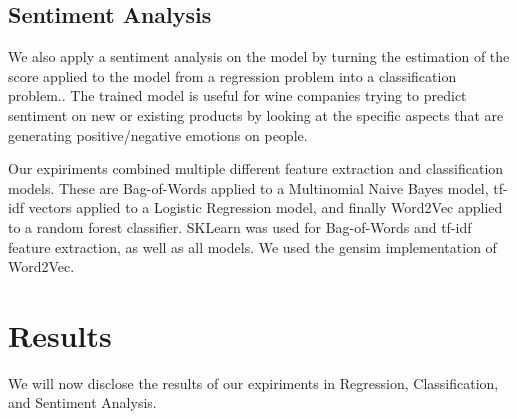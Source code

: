 \documentclass[12pt]{IEEEtran}
\begin{document}
\subsection{Sentiment Analysis}
    We also apply a sentiment analysis on the model by turning the estimation of the score applied to the model from a regression problem into a classification problem.. The trained model is useful for wine companies trying to predict sentiment on new or existing products by looking at the specific aspects that are generating positive/negative emotions on people. \par
    Our expiriments combined multiple different feature extraction and classification models. These are Bag-of-Words applied to a Multinomial Naive Bayes model, tf-idf vectors applied to a Logistic Regression model, and finally Word2Vec applied to a random forest classifier. SKLearn was used for Bag-of-Words and tf-idf feature extraction, as well as all models. We used the gensim implementation of Word2Vec\cite{gensim}. \par

\section{Results}
    We will now disclose the results of our expiriments in Regression, Classification, and Sentiment Analysis.
\end{document}
